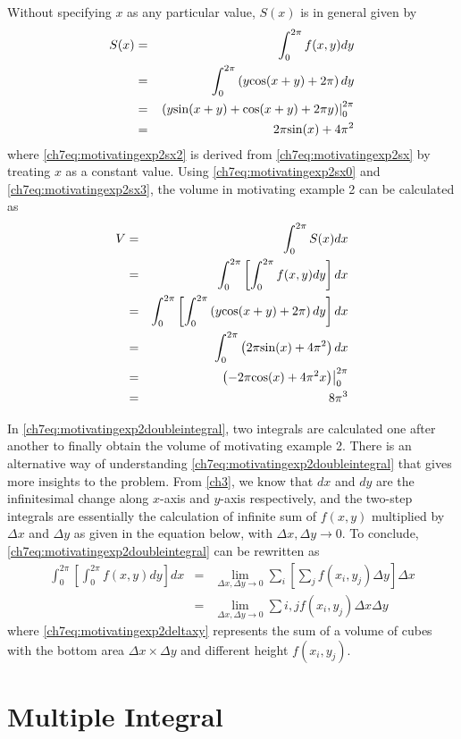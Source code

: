 Without specifying $x$ as any particular value, $S(x)$ is in general given by
\begin{eqnarray}
	S(x) &=& \int_{0}^{2\pi} f(x,y) dy \label{ch7eq:motivatingexp2sx0} \\ &=& \int_{0}^{2\pi}\left(y\textup{cos}(x+y)+2\pi\right)dy \label{ch7eq:motivatingexp2sx} \\
	&=& \left.\left(y\textup{sin}(x+y)+\textup{cos}(x+y) + 2\pi y\right)\right|_{0}^{2\pi} \label{ch7eq:motivatingexp2sx2} \\
	&=& 2\pi\textup{sin}(x) + 4\pi^2 \label{ch7eq:motivatingexp2sx3}
\end{eqnarray}
where \eqref{ch7eq:motivatingexp2sx2} is derived from \eqref{ch7eq:motivatingexp2sx} by treating $x$ as a constant value. Using  \eqref{ch7eq:motivatingexp2sx0} and \eqref{ch7eq:motivatingexp2sx3}, the volume in motivating example 2 can be calculated as
\begin{eqnarray}
	V &=& \int_{0}^{2\pi} S(x) dx \nonumber \\
	&=& \int_{0}^{2\pi} \left[\int_{0}^{2\pi}f(x,y)dy\right]dx \label{ch7eq:motivatingexp2doubleintegral} \\
	&=& \int_{0}^{2\pi} \left[ \int_{0}^{2\pi}\left(y\textup{cos}(x+y)+2\pi\right)dy\right] dx \nonumber \\
	&=& \int_{0}^{2\pi} \left(2\pi\textup{sin}(x) + 4\pi^2\right) dx \nonumber \\
	&=& \left.\left(-2\pi\textup{cos}(x) + 4\pi^2 x\right)\right|_{0}^{2\pi} \nonumber \\
	&=& 8\pi^3 \nonumber
\end{eqnarray}

In \eqref{ch7eq:motivatingexp2doubleintegral}, two integrals are calculated one after another to finally obtain the volume of motivating example 2. There is an alternative way of understanding \eqref{ch7eq:motivatingexp2doubleintegral} that gives more insights to the problem. From \ref{ch3}, we know that $dx$ and $dy$ are the infinitesimal change along $x$-axis and $y$-axis respectively, and the two-step integrals are essentially the calculation of infinite sum of $f(x,y)$ multiplied by $\Delta x$ and $\Delta y$ as given in the equation below, with $\Delta x, \Delta y \rightarrow 0$. To conclude, \eqref{ch7eq:motivatingexp2doubleintegral} can be rewritten as
\begin{eqnarray}
  \int_{0}^{2\pi} \left[\int_{0}^{2\pi}f(x,y)dy\right]dx &=& \lim_{\Delta x, \Delta y \rightarrow 0} \sum_{i} \left[\sum_{j} f(x_{i},y_{j}) \Delta y \right] \Delta x \nonumber \\
  &=& \lim_{\Delta x, \Delta y \rightarrow 0} \sum{i,j} f(x_i,y_j) \Delta x \Delta y \label{ch7eq:motivatingexp2deltaxy}
\end{eqnarray}
where \eqref{ch7eq:motivatingexp2deltaxy} represents the sum of a volume of cubes with the bottom area $\Delta x \times \Delta y$ and different height $f(x_i,y_j)$.



\section{Multiple Integral} \label{ch7sec:multipleintegral}

